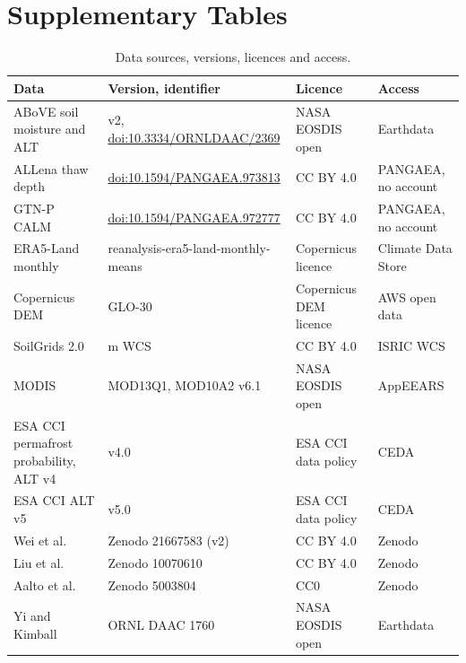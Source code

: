 \documentclass[pdflatex,sn-nature]{sn-jnl}
\begin{document}
\section{Supplementary Tables}

\begin{table}[p]
\caption{Data sources, versions, licences and access.}\label{tab:s1}
\scriptsize
\begin{tabular}{@{}>{\raggedright\arraybackslash}p{}>{\raggedright\arraybackslash}p{}>{\raggedright\arraybackslash}p{}>{\raggedright\arraybackslash}p{}@{}}
\toprule
Data & Version, identifier & Licence & Access \\
\midrule
ABoVE soil moisture and ALT\cite{Moore2025} & v2, \url{doi:10.3334/ORNLDAAC/2369} & NASA EOSDIS open & Earthdata \\
ALLena thaw depth\cite{Veremeeva2025} & \url{doi:10.1594/PANGAEA.973813} & CC BY 4.0 & PANGAEA, no account \\
GTN-P CALM\cite{Streletskiy2025} & \url{doi:10.1594/PANGAEA.972777} & CC BY 4.0 & PANGAEA, no account \\
ERA5-Land monthly\cite{munozsabater2021_era5_land} & reanalysis-era5-land-monthly-means & Copernicus licence & Climate Data Store \\
Copernicus DEM\cite{CopDEM2021} & GLO-30 & Copernicus DEM licence & AWS open data \\
SoilGrids 2.0\cite{Poggio2021} & 250 m WCS & CC BY 4.0 & ISRIC WCS \\
MODIS\cite{Didan2021,HallRiggs2021} & MOD13Q1, MOD10A2 v6.1 & NASA EOSDIS open & AppEEARS \\
ESA CCI permafrost probability, ALT v4\cite{Westermann2024} & v4.0 & ESA CCI data policy & CEDA \\
ESA CCI ALT v5\cite{Westermann2025} & v5.0 & ESA CCI data policy & CEDA \\
Wei et al.\cite{Wei2026} & Zenodo 21667583 (v2) & CC BY 4.0 & Zenodo \\
Liu et al.\cite{Liu2024} & Zenodo 10070610 & CC BY 4.0 & Zenodo \\
Aalto et al.\cite{Aalto2018} & Zenodo 5003804 & CC0 & Zenodo \\
Yi and Kimball\cite{YiKimball2019} & ORNL DAAC 1760 & NASA EOSDIS open & Earthdata \\
\bottomrule
\end{tabular}
\end{table}
\end{document}
